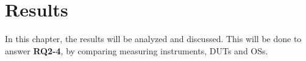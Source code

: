 \chapter{Results}\label{ch:results}

In this chapter, the results will be analyzed and discussed. This will be done to answer \textbf{RQ2-4}, by comparing measuring instruments, DUTs and OSs.








